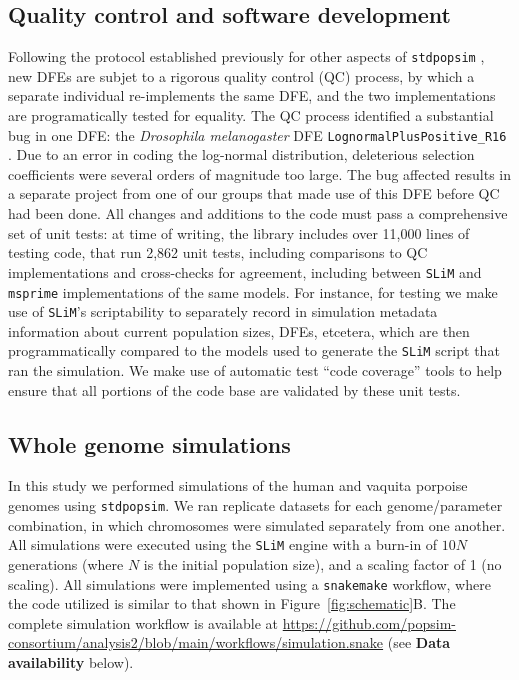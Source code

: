 \documentclass[hidelinks]{article}
\newcommand{\stdpopsim}{\texttt{stdpopsim}\xspace}
\newcommand{\slim}{\texttt{SLiM}\xspace}
\newcommand{\msprime}{\texttt{msprime}\xspace}
\newcommand{\snakemake}{\texttt{snakemake}\xspace}
\begin{document}
    \subsection*{Quality control and software development}
    Following the protocol established previously for other aspects of \stdpopsim{} \citep{adrion2020community},
    new DFEs are subjet to a rigorous quality control (QC) process,
    by which a separate individual re-implements the same DFE, and the two implementations
    are programatically tested for equality.
    The QC process identified a substantial bug in one DFE:
    the \textit{Drosophila melanogaster} DFE \texttt{LognormalPlusPositive\_R16} \citet{booker2021selective}.
    Due to an error in coding the log-normal distribution, deleterious selection coefficients
    were several orders of magnitude too large.
    The bug affected results in a separate project from one of our groups
    that made use of this DFE before QC had been done.
    All changes and additions to the code must pass a comprehensive set of unit tests:
    at time of writing, the library includes over 11,000 lines of testing code,
    that run 2,862 unit tests, including comparisons to QC implementations
    and cross-checks for agreement, including between \slim and \msprime implementations of the same models.
    For instance, for testing we make use of \slim's scriptability to separately record in simulation metadata
    information about current population sizes, DFEs, etcetera,
    which are then programmatically compared to the models used to generate the \slim script
    that ran the simulation.
    We make use of automatic test ``code coverage'' tools to help ensure that all portions of the code base
    are validated by these unit tests.

    \subsection*{Whole genome simulations}
    In this study we performed simulations of the human and vaquita porpoise genomes
    using \stdpopsim{}. We ran replicate datasets for each genome/parameter combination,
    in which chromosomes were simulated separately from one another.
    All simulations were executed using the \slim engine with a burn-in of $10N$ generations
    (where $N$ is the initial population size), and a scaling factor of 1 (no scaling).
    All simulations were implemented using a \snakemake workflow,
    where the code utilized is similar to that shown in Figure~\ref{fig:schematic}B.
    The complete simulation workflow is available at \url{https://github.com/popsim-consortium/analysis2/blob/main/workflows/simulation.snake}
    (see \textbf{Data availability} below).
\end{document}
